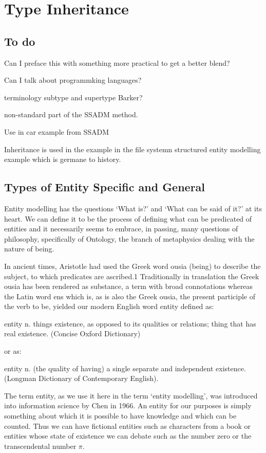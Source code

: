 \section{Type Inheritance}
\label{TypeInheritance}




\subsection*{To do}
\mynote 
Can I preface this with something more practical to get a better blend? 

Can I talk about programmking languages? 

terminology subtype and supertype Barker?

non-standard part of the SSADM method.

Use in car example from SSADM

Inheritance is used in the example in the file systemn structured entity modelling example which is germane to history.

\subsection*{Types of Entity Specific and General}
Entity modelling has the questions ‘What is?’ and ‘What can be said of it?’ at its heart. We can define it to be the process of defining what can be predicated of entities and it necessarily seems to embrace, in passing, many questions of philosophy, specifically of Ontology, the branch of metaphysics dealing with the nature of being.

In ancient times, Aristotle had used the Greek word ousia (being) to describe the subject, to which predicates are ascribed.1 Traditionally in translation the Greek ousia has been rendered as substance, a term with broad connotations whereas the Latin word ens which is, as is also the Greek ousia, the present participle of the verb to be, yielded our modern English word entity defined as:
\begin{erquote}
entity n. things existence, as opposed to its qualities or relations; thing that has real existence. (Concise Oxford Dictionary)
\end{erquote}
or as:
\begin{erquote}
entity n. (the quality of having) a single separate and independent existence. (Longman Dictionary of Contemporary English).
\end{erquote}
The term entity, as we use it here in the term ‘entity modelling’, was introduced into information science by Chen in 1966. An entity for our purposes is simply something about which it is possible to have knowledge and which can be counted. Thus we can have fictional entities such as characters from a book or entities whose state of existence we can debate such as the number zero or the transcendental number $\pi$.

